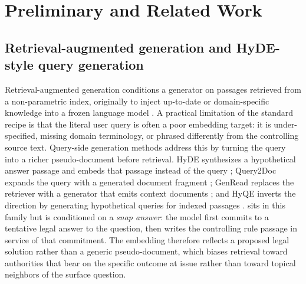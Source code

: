 \section{Preliminary and Related Work}\label{sec:preliminary}

\subsection{Retrieval-augmented generation and HyDE-style query generation}
Retrieval-augmented generation conditions a generator on passages retrieved
from a non-parametric index, originally to inject up-to-date or
domain-specific knowledge into a frozen language model
\citep{lewis2020rag,izacard2021fid}. A practical limitation of the standard
recipe is that the literal user query is often a poor embedding target: it is
under-specified, missing domain terminology, or phrased differently from the
controlling source text. Query-side generation methods address this by
turning the query into a richer pseudo-document before retrieval. HyDE
synthesizes a hypothetical answer passage and embeds that passage instead of
the query \citep{gao2023hyde}; Query2Doc expands the query with a generated
document fragment \citep{wang2023query2doc}; GenRead replaces the retriever
with a generator that emits context documents \citep{yu2023genread}; and HyQE
inverts the direction by generating hypothetical queries for indexed passages
\citep{zhou2024hyqe}. \hyre{} sits in this family but is conditioned on a
\emph{snap answer}: the model first commits to a tentative legal answer to the
question, then writes the controlling rule passage in service of that
commitment. The embedding therefore reflects a proposed legal solution rather
than a generic pseudo-document, which biases retrieval toward authorities
that bear on the specific outcome at issue rather than toward topical
neighbors of the surface question.


